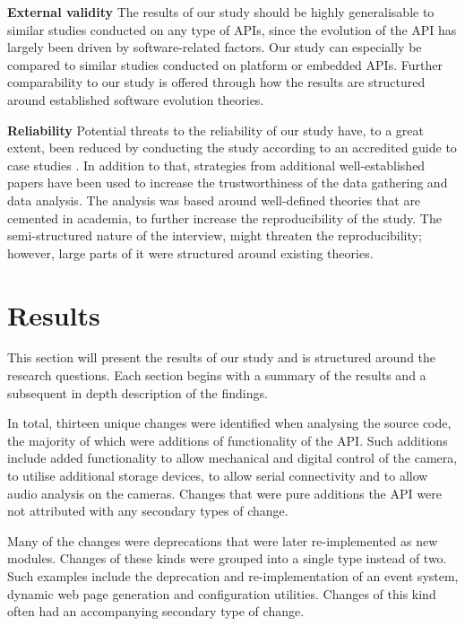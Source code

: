 \documentclass{sig-alternate}
\begin{document}
\smallskip \noindent
\textbf{External validity  } The results of our study should be highly generalisable to similar studies conducted on any type of APIs, since the evolution of the API has largely been driven by software-related factors. Our study can especially be compared to similar studies conducted on platform or embedded APIs. Further comparability to our study is offered through how the results are structured around established software evolution theories. 

\smallskip \noindent
\textbf{Reliability  } Potential threats to the reliability of our study have, to a great extent, been reduced by conducting the study according to an accredited guide to case studies \cite{runeson2009guidelines}. In addition to that, strategies from additional well-established papers \cite{andersson2007spiral, seaman1999qualitative, robson2002real} have been used to increase the trustworthiness of the data gathering and data analysis. The analysis was based around well-defined theories that are cemented in academia, to further increase the reproducibility of the study. The semi-structured nature of the interview, might threaten the reproducibility; however, large parts of it were structured around existing theories. 




\section{Results} \label{results} 

This section will present the results of our study and is structured around the research questions. Each section begins with a summary of the results and a subsequent in depth description of the findings.

In total, thirteen unique changes were identified when analysing the source code, the majority of which were additions of functionality of the API. Such additions include added functionality to allow mechanical and digital control of the camera, to utilise additional storage devices, to allow serial connectivity and to allow audio analysis on the cameras. Changes that were pure additions the API were not attributed with any secondary types of change.

Many of the changes were deprecations that were later re-implemented as new modules. Changes of these kinds were grouped into a single type instead of two. Such examples include the deprecation and re-implementation of an event system, dynamic web page generation and configuration utilities. Changes of this kind often had an accompanying secondary type of change.
\end{document}
